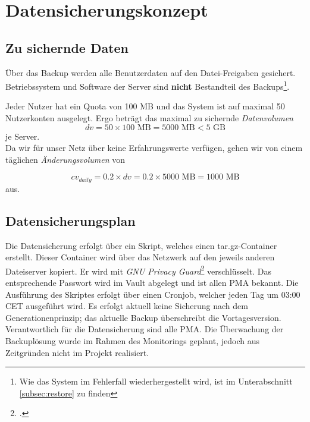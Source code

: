 \newpage
\section{Datensicherungskonzept}
\subsection{Zu sichernde Daten}
Über das Backup werden alle Benutzerdaten auf den Datei-Freigaben gesichert. Betriebssystem und Software der Server sind \textbf{nicht} Bestandteil des Backups\footnote{Wie das System im Fehlerfall wiederhergestellt wird, ist im Unterabschnitt \ref{subsec:restore} zu finden}.

Jeder Nutzer hat ein Quota von 100 MB und das System ist auf maximal 50 Nutzerkonten ausgelegt. Ergo beträgt das maximal zu sichernde \emph{Datenvolumen}
\begin{equation}
dv = 50 \times 100 \text{ MB} = 5000 \text{ MB} < 5 \text{ GB}
\end{equation}
je Server.\\

Da wir für unser Netz über keine Erfahrungswerte verfügen, gehen wir von einem täglichen \emph{Änderungsvolumen} von

\begin{equation}
cv_{daily} = 0.2 \times dv = 0.2 \times 5000 \text { MB} = 1000 \text{ MB}
\end{equation}
aus.

\subsection{Datensicherungsplan}
Die Datensicherung erfolgt über ein Skript, welches einen tar.gz-Container erstellt. Dieser Container wird über das Netzwerk auf den jeweils anderen Dateiserver kopiert. Er wird mit \emph{GNU Privacy Guard}\footcite{gnupg} verschlüsselt. Das entsprechende Passwort wird im Vault abgelegt und ist allen PMA bekannt. Die Ausführung des Skriptes erfolgt über einen Cronjob, welcher jeden Tag um 03:00 CET ausgeführt wird. Es erfolgt aktuell keine Sicherung nach dem Generationenprinzip; das aktuelle Backup überschreibt die Vortagesversion. Verantwortlich für die Datensicherung sind alle PMA. Die Überwachung der Backuplösung wurde im Rahmen des Monitorings geplant, jedoch aus Zeitgründen nicht im Projekt realisiert.\\

